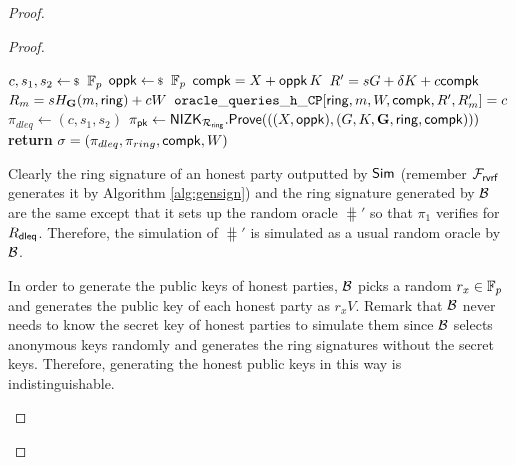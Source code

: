 \begin{proof}
\begin{proof}
			
			\begin{algorithm}
				\caption{$\gen_{sign}(\ring,W,X,m)$}
				\label{alg:gensignbdv}	 	
				\begin{algorithmic}[1]
					\State $ c,s_1, s_2 \leftsample \FF_p $
					\State $ \openpk \leftsample \FF_p $
					\State $ \mathsf{compk} =  X + \mathsf{oppk} \, K$
					\State $ R' = sG +\delta K + c\mathsf{compk}$
					\State $ R_m = sH_{\mathbf{G}}(m, \mathsf{ring}) + c W $
					\State $ \mathtt{oracle\_queries\_h\_CP}[\mathsf{ring},m, W, \mathsf{compk},R',R'_m] = c$						
					\State $ \pi_{dleq} \leftarrow (c,s_1, s_2) $
					\State $ \pi_{\mathsf{pk}} \leftarrow  {\ensuremath{\mathsf{NIZK}}}_{\mathcal{R}_{\mathsf{ring}}}.{\mathsf{Prove}}(((X, \mathsf{oppk}),(G,K,{\mathbf{G}},\mathsf{ring}, \mathsf{compk}))) $
					\State \textbf{return} $ \sigma = (\pi_{dleq},\pi_{ring},\mathsf{compk},W) $
				\end{algorithmic}
				
			\end{algorithm}
			
			
			Clearly the ring signature of an honest party outputted by $ \mathsf{Sim} $ (remember $ \mathcal{F}_{\textsf{rvrf}}$ generates it by Algorithm \ref{alg:gensign}) and the ring signature generated by $ \mathcal{B} $ are the same except that it sets up the random oracle $ \hash' $ so that $ \pi_1 $ verifies for $ R_{\mathsf{dleq}} $. Therefore, the simulation of $ \hash' $ is simulated as a usual random oracle by $ \mathcal{B} $.
			
			In order to generate the public keys of honest parties, $ \mathcal{B} $ picks a random $ r_x\in \mathbb{F}_p $ and generates the public key of each honest party as $ r_xV$.
			Remark that $ \mathcal{B}$  never needs to know the secret key of honest parties to simulate them since $ \mathcal{B} $ selects anonymous keys randomly  and generates the ring signatures  without the secret keys. Therefore, generating the honest public keys in this way is indistinguishable. 			
			\begin{figure}
				\centering
				
				\noindent{}
\end{figure}
\end{proof}
\end{proof}

